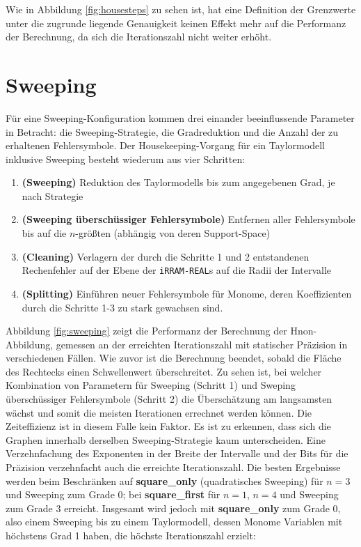 
Wie in Abbildung \ref{fig:housesteps} zu sehen ist, hat eine Definition der Grenzwerte unter die zugrunde liegende Genauigkeit keinen Effekt mehr auf die Performanz der Berechnung, da sich die Iterationszahl nicht weiter erhöht.  

\newpage
\section{Sweeping}
 Für eine Sweeping-Konfiguration kommen drei einander beeinflussende Parameter in Betracht: die Sweeping-Strategie, die Gradreduktion und die Anzahl der zu erhaltenen Fehlersymbole. Der Housekeeping-Vorgang für ein Taylormodell inklusive Sweeping besteht wiederum aus vier Schritten:
 \begin{enumerate}
  \item \textbf{(Sweeping)} Reduktion des Taylormodells bis zum angegebenen Grad, je nach Strategie
  \item \textbf{(Sweeping überschüssiger Fehlersymbole)} Entfernen aller Fehlersymbole bis auf die $n$-größten (abhängig von deren Support-Space)
  \item \textbf{(Cleaning)} Verlagern der durch die Schritte 1 und 2 entstandenen Rechenfehler auf der Ebene der \verb+iRRAM-REAL+s auf die Radii der Intervalle
  \item \textbf{(Splitting)} Einführen neuer Fehlersymbole für Monome, deren Koeffizienten durch die Schritte 1-3 zu stark gewachsen sind.
 \end{enumerate}

 Abbildung \ref{fig:sweeping} zeigt die Performanz der Berechnung der H\e non-Abbildung, gemessen an der erreichten Iterationszahl mit statischer Präzision in verschiedenen Fällen. Wie zuvor ist die Berechnung beendet, sobald die Fläche des Rechtecks einen Schwellenwert überschreitet. Zu sehen ist, bei welcher Kombination von Parametern für Sweeping (Schritt 1) und Sweping überschüssiger Fehlersymbole (Schritt 2) die Überschätzung am langsamsten wächst und somit die meisten Iterationen errechnet werden können. Die Zeiteffizienz ist in diesem Falle kein Faktor. Es ist zu erkennen, dass sich die Graphen innerhalb derselben Sweeping-Strategie kaum unterscheiden. Eine Verzehnfachung des Exponenten in der Breite der Intervalle und der Bits für die Präzision verzehnfacht auch die erreichte Iterationszahl. Die besten Ergebnisse werden beim Beschränken auf \textbf{square\_only} (quadratisches Sweeping) für $n=3$ und Sweeping zum Grade 0; bei \textbf{square\_first} für $n=1$, $n=4$ und Sweeping zum Grade 3 erreicht. Insgesamt wird jedoch mit \textbf{square\_only} zum Grade 0, also einem Sweeping bis zu einem Taylormodell, dessen Monome Variablen mit höchstens Grad 1 haben, die höchste Iterationszahl erzielt:

